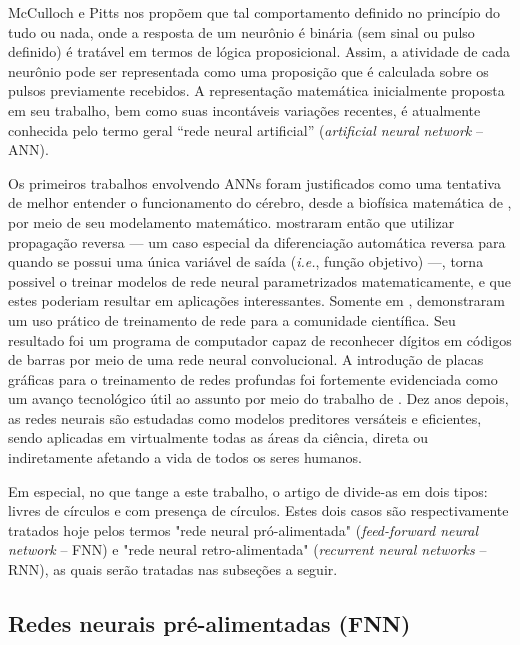     McCulloch e Pitts nos propõem que tal comportamento definido no princípio do tudo ou nada, onde a resposta de um neurônio é binária (sem sinal ou pulso definido) é tratável em termos de lógica proposicional. Assim, a atividade de cada neurônio pode ser representada como uma proposição que é calculada sobre os pulsos previamente recebidos. A representação matemática inicialmente proposta em seu trabalho, bem como suas incontáveis variações recentes, é atualmente conhecida pelo termo geral ``rede neural artificial'' (\textit{artificial neural network} -- ANN).

    Os primeiros trabalhos envolvendo ANNs foram justificados como uma tentativa de melhor entender o funcionamento do cérebro, desde a biofísica matemática de , por meio de seu modelamento matemático.  mostraram então que utilizar propagação reversa --- um caso especial da diferenciação automática reversa para quando se possui uma única variável de saída (\textit{i.e.}, função objetivo) ---, torna possivel o treinar modelos de rede neural parametrizados matematicamente, e que estes poderiam resultar em aplicações interessantes. Somente em ,  demonstraram um uso prático de treinamento de rede para a comunidade científica. Seu resultado foi um programa de computador capaz de reconhecer dígitos em códigos de barras por meio de uma rede neural convolucional. A introdução de placas gráficas para o treinamento de redes profundas foi fortemente evidenciada como um avanço tecnológico útil ao assunto por meio do trabalho de . Dez anos depois, as redes neurais são estudadas como modelos preditores versáteis e eficientes, sendo aplicadas em virtualmente todas as áreas da ciência, direta ou indiretamente afetando a vida de todos os seres humanos.

    Em especial, no que tange a este trabalho, o artigo de  divide-as em dois tipos: livres de círculos e com presença de círculos. Estes dois casos são respectivamente tratados hoje pelos termos "rede neural pró-alimentada" (\textit{feed-forward neural network} -- FNN) e "rede neural retro-alimentada" (\textit{recurrent neural networks} -- RNN), as quais serão tratadas nas subseções a seguir.

    \subsection{Redes neurais pré-alimentadas (FNN)} \label{s:fnn}

